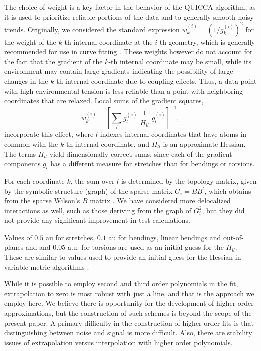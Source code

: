 \documentclass[prl,twocolumn,showpacs,twocolumngrid,superbib]{revtex4}
\begin{document}
The choice of weight is a key factor in the behavior of the QUICCA algorithm, as it is used to prioritize 
reliable portions of the data and to generally smooth noisy trends.  
Originally, we considered the standard expression $w_{k}^{(i)}=\left(1/{g_{k}^{(i)}}\right)^2$ for the weight 
of the $k$-th internal coordinate at the $i$-th geometry, which is generally recommended for use in curve 
fitting \cite{numerical_recipies}.  These weights however do not 
account for the fact that the gradient of the $k$-th internal coordinate may be small, while 
its environment may contain large gradients indicating the possibility of large changes in the $k$-th 
internal coordinate due to coupling effects.  Thus, a data point with high environmental tension 
is less reliable than a point with neighboring coordinates that are relaxed.   
Local sums of the gradient squares,
\begin{equation}
\label{weights}
w_{k}^{(i)} = \left[ \sum_{l} g_{l}^{(i)} \frac{1}{|H_{ll}^{}|} g_{l}^{(i)} \right]^{-1} ,
\end{equation}
incorporate this effect, where  $l$ indexes internal coordinates that have atoms in common with 
the $k$-th internal coordinate, and $H_{ll}^{}$ is an approximate Hessian.  The terms 
$H_{ll}^{}$ yield dimensionally correct sums, since each of the gradient components  $g_{l}$ has a 
different measure for stretches than for bendings or torsions.  

For each coordinate $k$, the sum over $l$ is determined by the topology matrix, given by the symbolic 
structure (graph) of the sparse matrix $G_{i}=BB^{t}$, which obtains from the sparse Wilson's $B$ 
matrix \cite{wilson}.  We have considered more delocalized interactions as well, such as those deriving 
from the graph of $G_i^2$, but they did not provide any significant improvement in test calculations.

Values of $0.5$ au for stretches, $0.1$ au for bendings, linear bendings and out-of-planes and and $0.05$ a.u.
for torsions are used as an initial guess for the $H_{ll}$.  These are similar to values used to provide 
an initial guess for the Hessian in variable metric algorithms \cite{}.  

While it is possible to employ second and third order polynomials in the fit, extrapolation
to zero is most robust with just a line, and that is the approach we employ here.  We believe there
is opportunity for the development of higher order approximations,  but the construction of such 
schemes is beyond the scope of the present paper.  A primary difficulty in the construction of higher 
order fits is that distinguishing between noise and signal is more difficult.  Also, there are stability 
issues of extrapolation versus interpolation with higher order polynomials.
\end{document}
